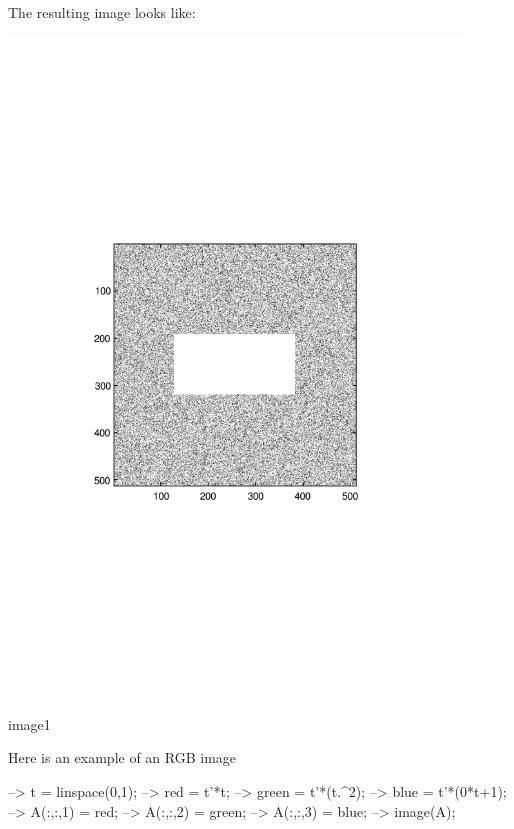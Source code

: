 The resulting image looks like\-:  
\begin{DoxyImage}
\includegraphics[width=12cm]{image1}
\caption{image1}
\end{DoxyImage}
 Here is an example of an R\-G\-B image


\begin{DoxyVerbInclude}
--> t = linspace(0,1);
--> red = t'*t;
--> green = t'*(t.^2);
--> blue = t'*(0*t+1);
--> A(:,:,1) = red; 
--> A(:,:,2) = green; 
--> A(:,:,3) = blue;
--> image(A);
\end{DoxyVerbInclude}


